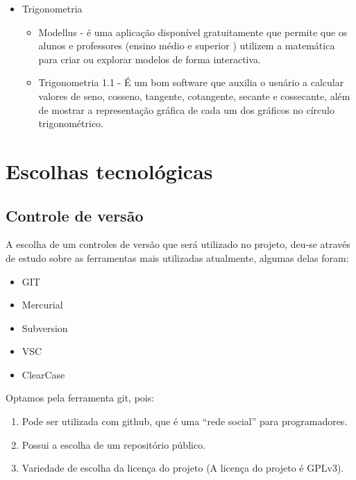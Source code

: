 \documentclass[12pt,a4paper]{article}
\begin{document}
\begin{itemize}
\begin{itemize}
\end{itemize}

\item Trigonometria 

\begin{itemize}
\item  Modellus - é uma aplicação disponível gratuitamente que permite que os alunos e professores (ensino médio e superior ) utilizem a matemática para criar ou explorar modelos de forma interactiva.

\item Trigonometria 1.1 -  É um bom software que auxilia o usuário a calcular valores de seno, cosseno, tangente, cotangente, secante e cossecante, além de mostrar a representação gráfica de cada um dos gráficos no círculo trigonométrico.

\end{itemize}

\end{itemize}




\section{Escolhas tecnológicas}

\subsection {Controle de versão}
A escolha de um controles de versão que será utilizado no projeto, deu-se através de estudo sobre as ferramentas mais utilizadas atualmente, algumas delas foram:
\begin{itemize}
\item GIT
\item Mercurial
\item Subversion
\item VSC
\item ClearCase
\end{itemize}
Optamos pela ferramenta git, pois:

\begin{enumerate}
\item Pode ser utilizada com github, que é uma “rede social” para programadores.
\item Possui a escolha de um repositório público.
\item Variedade de escolha da licença do projeto (A licença do projeto é GPLv3).
\end{enumerate}
\end{document}
